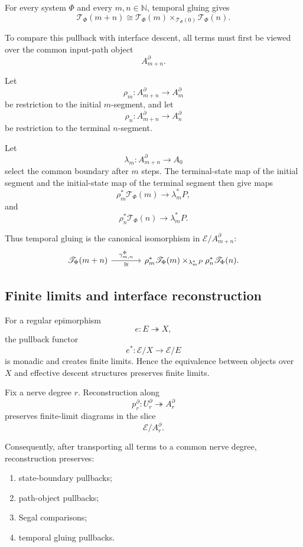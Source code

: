 For every system \(\Phi\) and every \(m,n\in\mathbb N\), temporal gluing gives
\[
    \mathscr T_\Phi(m+n)
    \cong
    \mathscr T_\Phi(m)
    \times_{\mathscr T_\Phi(0)}
    \mathscr T_\Phi(n).
\]

To compare this pullback with interface descent, all terms must first be
viewed over the common input-path object
\[
    A_{m+n}^\partial.
\]

Let
\[
    \rho_m:
    A_{m+n}^\partial\to A_m^\partial
\]
be restriction to the initial \(m\)-segment, and let
\[
    \rho_n:
    A_{m+n}^\partial\to A_n^\partial
\]
be restriction to the terminal \(n\)-segment.

Let
\[
    \lambda_m:
    A_{m+n}^\partial\to A_0
\]
select the common boundary after \(m\) steps. The terminal-state map of the
initial segment and the initial-state map of the terminal segment then give
maps
\[
    \rho_m^\ast\mathscr T_\Phi(m)
    \to
    \lambda_m^\ast P,
\]
and
\[
    \rho_n^\ast\mathscr T_\Phi(n)
    \to
    \lambda_m^\ast P.
\]

Thus temporal gluing is the canonical isomorphism in
\(\mathcal E/A_{m+n}^\partial\):
\[
\begin{tikzcd}[column sep=large]
    \mathscr T_\Phi(m+n)
        \arrow[r, "\gamma_{m,n}^\Phi", "\cong"']
    &
    \rho_m^\ast\mathscr T_\Phi(m)
    \times_{\lambda_m^\ast P}
    \rho_n^\ast\mathscr T_\Phi(n).
\end{tikzcd}
\]

\subsection{Finite limits and interface reconstruction}
\label{subsec:finite-limits-descent-reconstruction}

For a regular epimorphism
\[
    e:E\twoheadrightarrow X,
\]
the pullback functor
\[
    e^\ast:\mathcal E/X\to\mathcal E/E
\]
is monadic and creates finite limits. Hence the equivalence between objects
over \(X\) and effective descent structures preserves finite limits.

\begin{proposition}
\label{prop:finite-limit-preservation-interface-reconstruction}
Fix a nerve degree \(r\). Reconstruction along
\[
    p_r^\partial:
    U_r^\partial\twoheadrightarrow A_r^\partial
\]
preserves finite-limit diagrams in the slice
\[
    \mathcal E/A_r^\partial.
\]

Consequently, after transporting all terms to a common nerve degree,
reconstruction preserves:
\begin{enumerate}
    \item state-boundary pullbacks;
    \item path-object pullbacks;
    \item Segal comparisons;
    \item temporal gluing pullbacks.
\end{enumerate}
\end{proposition}

